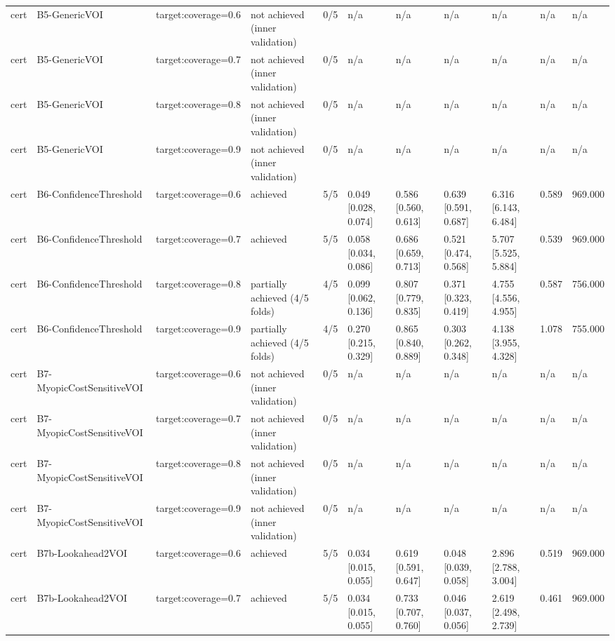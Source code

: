\begin{table}[!ht]
{\begin{tabular}{lllllllllll}
cert & B5-GenericVOI & target:coverage=0.6 & not achieved (inner validation) & 0/5 & n/a & n/a & n/a & n/a & n/a & n/a \\
cert & B5-GenericVOI & target:coverage=0.7 & not achieved (inner validation) & 0/5 & n/a & n/a & n/a & n/a & n/a & n/a \\
cert & B5-GenericVOI & target:coverage=0.8 & not achieved (inner validation) & 0/5 & n/a & n/a & n/a & n/a & n/a & n/a \\
cert & B5-GenericVOI & target:coverage=0.9 & not achieved (inner validation) & 0/5 & n/a & n/a & n/a & n/a & n/a & n/a \\
cert & B6-ConfidenceThreshold & target:coverage=0.6 & achieved & 5/5 & 0.049 [0.028, 0.074] & 0.586 [0.560, 0.613] & 0.639 [0.591, 0.687] & 6.316 [6.143, 6.484] & 0.589 & 969.000 \\
cert & B6-ConfidenceThreshold & target:coverage=0.7 & achieved & 5/5 & 0.058 [0.034, 0.086] & 0.686 [0.659, 0.713] & 0.521 [0.474, 0.568] & 5.707 [5.525, 5.884] & 0.539 & 969.000 \\
cert & B6-ConfidenceThreshold & target:coverage=0.8 & partially achieved (4/5 folds) & 4/5 & 0.099 [0.062, 0.136] & 0.807 [0.779, 0.835] & 0.371 [0.323, 0.419] & 4.755 [4.556, 4.955] & 0.587 & 756.000 \\
cert & B6-ConfidenceThreshold & target:coverage=0.9 & partially achieved (4/5 folds) & 4/5 & 0.270 [0.215, 0.329] & 0.865 [0.840, 0.889] & 0.303 [0.262, 0.348] & 4.138 [3.955, 4.328] & 1.078 & 755.000 \\
cert & B7-MyopicCostSensitiveVOI & target:coverage=0.6 & not achieved (inner validation) & 0/5 & n/a & n/a & n/a & n/a & n/a & n/a \\
cert & B7-MyopicCostSensitiveVOI & target:coverage=0.7 & not achieved (inner validation) & 0/5 & n/a & n/a & n/a & n/a & n/a & n/a \\
cert & B7-MyopicCostSensitiveVOI & target:coverage=0.8 & not achieved (inner validation) & 0/5 & n/a & n/a & n/a & n/a & n/a & n/a \\
cert & B7-MyopicCostSensitiveVOI & target:coverage=0.9 & not achieved (inner validation) & 0/5 & n/a & n/a & n/a & n/a & n/a & n/a \\
cert & B7b-Lookahead2VOI & target:coverage=0.6 & achieved & 5/5 & 0.034 [0.015, 0.055] & 0.619 [0.591, 0.647] & 0.048 [0.039, 0.058] & 2.896 [2.788, 3.004] & 0.519 & 969.000 \\
cert & B7b-Lookahead2VOI & target:coverage=0.7 & achieved & 5/5 & 0.034 [0.015, 0.055] & 0.733 [0.707, 0.760] & 0.046 [0.037, 0.056] & 2.619 [2.498, 2.739] & 0.461 & 969.000 \\

\end{tabular}}
\end{table}
